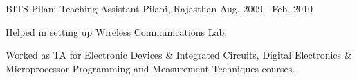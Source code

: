 \begin{cventries}
  \cventry
    {BITS-Pilani} %
    {Teaching Assistant} %
    {Pilani, Rajasthan} %
    {Aug, 2009 - Feb, 2010} %
    {
      \begin{cvitems} %
        \item {Helped in setting up Wireless Communications Lab.}
        \item {Worked as TA for Electronic Devices \& Integrated Circuits, Digital Electronics \& Microprocessor Programming and Measurement Techniques courses.}
      \end{cvitems}
    }
\end{cventries}
